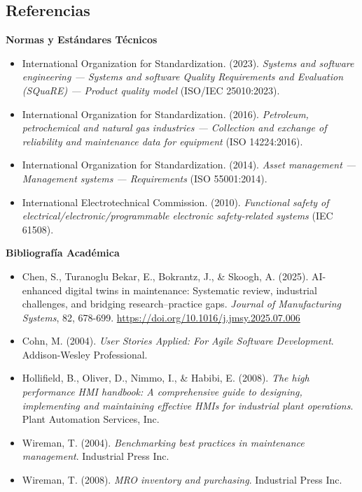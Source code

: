 \subsection{Referencias}
\begin{sloppypar}

\textbf{Normas y Estándares Técnicos}

\begin{itemize}
    \item International Organization for Standardization. (2023). \textit{Systems and software engineering — Systems and software Quality Requirements and Evaluation (SQuaRE) — Product quality model} (ISO/IEC 25010:2023).
    \item International Organization for Standardization. (2016). \textit{Petroleum, petrochemical and natural gas industries — Collection and exchange of reliability and maintenance data for equipment} (ISO 14224:2016).
    \item International Organization for Standardization. (2014). \textit{Asset management — Management systems — Requirements} (ISO 55001:2014).
    \item International Electrotechnical Commission. (2010). \textit{Functional safety of electrical\slash electronic\slash programmable electronic safety-related systems} (IEC 61508).
\end{itemize}
\textbf{Bibliografía Académica}

\begin{itemize}
    \item Chen, S., Turanoglu Bekar, E., Bokrantz, J., \& Skoogh, A. (2025). AI-enhanced digital twins in maintenance: Systematic review, industrial challenges, and bridging research–practice gaps. \textit{Journal of Manufacturing Systems}, 82, 678-699. \url{https://doi.org/10.1016/j.jmsy.2025.07.006}
    \item Cohn, M. (2004). \textit{User Stories Applied: For Agile Software Development}. Addison-Wesley Professional.
    \item Hollifield, B., Oliver, D., Nimmo, I., \& Habibi, E. (2008). \textit{The high performance HMI handbook: A comprehensive guide to designing, implementing and maintaining effective HMIs for industrial plant operations}. Plant Automation Services, Inc.
    \item Wireman, T. (2004). \textit{Benchmarking best practices in maintenance management}. Industrial Press Inc.
    \item Wireman, T. (2008). \textit{MRO inventory and purchasing}. Industrial Press Inc.
\end{itemize}
\end{sloppypar}
